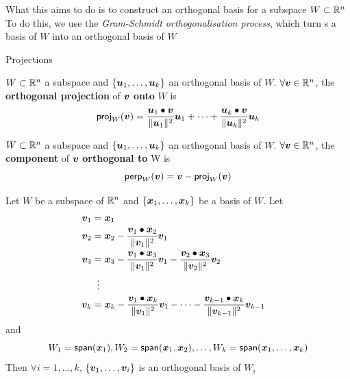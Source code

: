 \documentclass[aspectratio=169]{beamer}\usepackage[]{graphicx}\usepackage[]{xcolor}
\begin{document}

\begin{frame}
What this aims to do is to construct an orthogonal basis for a subspace $W\subset\mathbb{R}^n$
\vfill
To do this, we use the \emph{Gram-Schmidt orthogonalisation process}, which turn s a basis of $W$ into an orthogonal basis of $W$
\end{frame}

\begin{frame}{Projections}
\begin{importantdefinition}
$W\subset\mathbb{R}^n$ a subspace and $\{\bm{u}_1,\ldots,\bm{u}_k\}$ an orthogonal basis of $W$. $\forall\bm{v}\in\mathbb{R}^n$, the \textbf{orthogonal projection} of $\bm{v}$ \textbf{onto} $W$ is
\[
\mathsf{proj}_W(\bm{v}) =
\frac{\bm{u}_1\bullet\bm{v}}{\|\bm{u}_1\|^2}\bm{u}_1
+\cdots+
\frac{\bm{u}_k\bullet\bm{v}}{\|\bm{u}_k\|^2}\bm{u}_k
\]  
\end{importantdefinition}
\vfill
\begin{importantdefinition}
$W\subset\mathbb{R}^n$ a subspace and $\{\bm{u}_1,\ldots,\bm{u}_k\}$ an orthogonal basis of $W$. $\forall\bm{v}\in\mathbb{R}^n$, the \textbf{component} of  $\bm{v}$ \textbf{orthogonal to} W is
\[
\mathsf{perp}_W(\bm{v})=\bm{v}-\mathsf{proj}_W(\bm{v})
\]
\end{importantdefinition}	
\end{frame}

\begin{frame}
\begin{theorem}
Let $W$ be a subspace of $\mathbb{R}^n$ and $\{\bm{x}_1,\ldots,\bm{x}_k\}$ be a basis of $W$. 
Let
\begin{align*}
\bm{v}_1 &= \bm{x}_1 \\
\bm{v}_2 &= \bm{x}_2 -\frac{\bm{v}_1\bullet\bm{x}_2}{\|\bm{v}_1\|^2}\bm{v}_1 \\
\bm{v}_3 &= \bm{x}_3 -\frac{\bm{v}_1\bullet\bm{x}_3}{\|\bm{v}_1\|^2}\bm{v}_1 -\frac{\bm{v}_2\bullet\bm{x}_3}{\|\bm{v}_2\|^2}\bm{v}_2 \\
&\;\;\vdots & \\
\bm{v}_k &= \bm{x}_k -\frac{\bm{v}_1\bullet\bm{x}_k}{\|\bm{v}_1\|^2}\bm{v}_1 -\cdots-\frac{\bm{v}_{k-1}\bullet\bm{x}_k}{\|\bm{v}_{k-1}\|^2}\bm{v}_{k-1}
\end{align*}
and
\[
W_1=\mathsf{span}(\bm{x}_1),W_2 = \mathsf{span}(\bm{x}_1,\bm{x}_2),\ldots,
W_k = \mathsf{span}(\bm{x}_1,\ldots,\bm{x}_k)
\]
Then $\forall i=1,\ldots,k$, $\{\bm{v}_1,\ldots,\bm{v}_i\}$ is an orthogonal basis of $W_i$
\end{theorem}
\end{frame}
\end{document}
